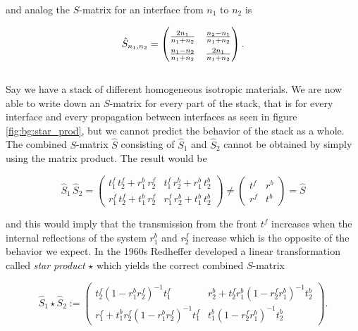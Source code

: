 and analog the $S$-matrix for an interface from $n_1$ to $n_2$ is

\begin{equation}
    \hat S_{n_1, n_2} =
    \begingroup
    \renewcommand*{\arraystretch}{1.5}
        \begin{pmatrix}
            \frac{2 n_1}{n_1 + n_2} & \frac{n_2 - n_1}{n_1 + n_2} \\
            \frac{n_1 - n_2}{n_1 + n_2} & \frac{2 n_1}{n_1 + n_2}
        \end{pmatrix}
    \endgroup.
\end{equation}
\\


Say we have a stack of different homogeneous isotropic materials. We are now able to write down an $S$-matrix for every part of the stack, that is for every interface and every propagation between interfaces as seen in figure \ref{fig:bg:star_prod}, but we cannot predict the behavior of the stack as a whole.
\\

\indent
The combined $S$-matrix $\hat S$ consisting of $\hat S_1$ and $\hat S_2$ cannot be obtained by simply using the matrix product. The result would be

\begin{equation}
    \hat S_1 \, \hat S_2 =
    \begin{pmatrix}
        t^f_1 \, t^f_2 + r^b_1 \, r^f_2 & t^f_1 \, r^b_2 + r^b_1 \, t^b_2 \\
        r^f_1 \, t^f_2 + t^b_1 \, r^f_2 & r^f_1 \, r^b_2 + t^b_1 \, t^b_2
    \end{pmatrix} \neq
    \begin{pmatrix}
        t^f & r^b \\
        r^f & t^b
    \end{pmatrix} =
    \hat S
\end{equation}

and this would imply that the transmission from the front $t^f$ increases when the internal reflections of the system $r^b_1$ and $r^f_2$ increase which is the opposite of the behavior we expect. In the 1960s Redheffer \cite{Redheffer1960} developed a linear transformation called \textit{star product} $\star$ which yields the correct combined $S$-matrix

\begin{equation}\label{eq:bg:star}
    \hat S_1 \star \hat S_2 :=
    \begin{pmatrix}
        t^f_2 (1 - r^b_1 r^f_2)^{-1} t^f_1 &
        r^b_2 + t^f_2 r^b_1 (1 - r^f_2 r^b_1)^{-1} t^b_2\\
        r^f_1 + t^b_1 r^f_2 (1 - r^b_1 r^f_2)^{-1} t^f_1 &
        t^b_1 (1 - r^f_2 r^b_1)^{-1} t^b_2
    \end{pmatrix}.
\end{equation}
\\

